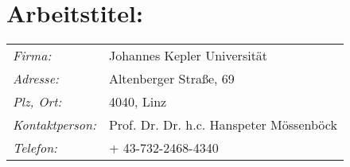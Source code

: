 

\chapter*{Arbeitstitel: \newline \htlArbeitstitel}






\renewcommand{\arraystretch}{1.5}
\begin{tabularx}{1\textwidth}{@{} l X @{}}

\emph{Firma:} & Johannes Kepler Universit\"at\\
\emph{Adresse:} & Altenberger Straße, 69\\
\emph{Plz, Ort:} & 4040, Linz\\
\emph{Kontaktperson:} & Prof. Dr. Dr. h.c. Hanspeter Mössenböck\\
\emph{Telefon:} & + 43-732-2468-4340\\

\end{tabularx}
